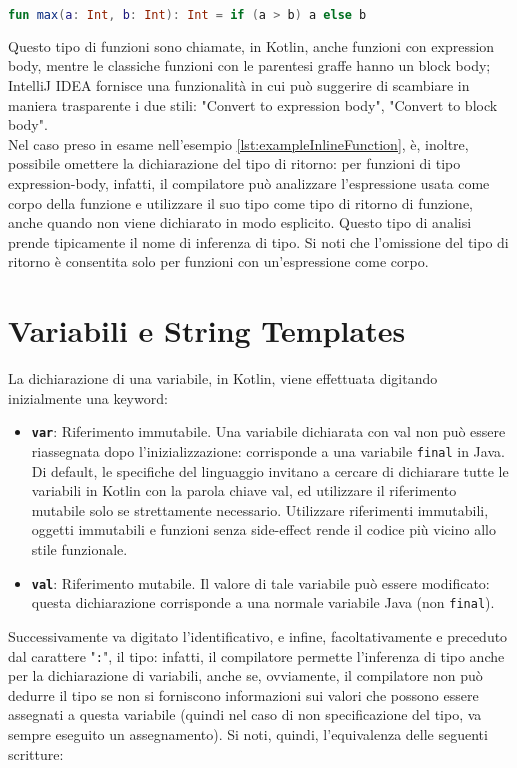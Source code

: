 \begin{lstlisting}[caption={Inline-function}, captionpos=b, label={lst:exampleInlineFunction}, language=Kotlin]
fun max(a: Int, b: Int): Int = if (a > b) a else b
\end{lstlisting}

Questo tipo di funzioni sono chiamate, in Kotlin, anche funzioni con expression body, mentre le classiche funzioni con le parentesi graffe hanno un block body; IntelliJ IDEA fornisce una funzionalità in cui può suggerire di scambiare in maniera trasparente i due stili: "Convert to expression body", "Convert to block body".\\

Nel caso preso in esame nell'esempio \ref{lst:exampleInlineFunction}, è, inoltre, possibile omettere la dichiarazione del tipo di ritorno: per funzioni di tipo expression-body, infatti, il compilatore può analizzare l'espressione usata come corpo della funzione e utilizzare il suo tipo come tipo di ritorno di funzione, anche quando non viene dichiarato in modo esplicito. Questo tipo di analisi prende tipicamente il nome di inferenza di tipo. Si noti che l'omissione del tipo di ritorno è consentita solo per funzioni con un'espressione come corpo.\\

\section{Variabili e String Templates}
La dichiarazione di una variabile, in Kotlin, viene effettuata digitando inizialmente una keyword:
\begin{itemize}
  \item {\bfseries\texttt{var}}: Riferimento immutabile. Una variabile dichiarata con val non può essere
  riassegnata dopo l'inizializzazione: corrisponde a una variabile \texttt{final} in Java. Di default, le specifiche del linguaggio invitano a cercare di dichiarare tutte le variabili in Kotlin con la parola chiave val, ed utilizzare il riferimento mutabile solo se strettamente necessario. Utilizzare riferimenti immutabili, oggetti immutabili e funzioni senza side-effect rende il codice più vicino allo stile funzionale.
  \item {\bfseries\texttt{val}}: Riferimento mutabile. Il valore di tale variabile può essere modificato: questa dichiarazione corrisponde a una normale variabile Java (non \texttt{final}).
\end{itemize}

Successivamente va digitato l'identificativo, e infine, facoltativamente e preceduto dal carattere "\texttt{:}", il tipo: infatti, il compilatore permette l'inferenza di tipo anche per la dichiarazione di variabili, anche se, ovviamente, il compilatore non può dedurre il tipo se non si forniscono informazioni sui valori che possono essere assegnati a questa variabile (quindi nel caso di non specificazione del tipo, va sempre eseguito un assegnamento). Si noti, quindi, l'equivalenza delle seguenti scritture:\\

